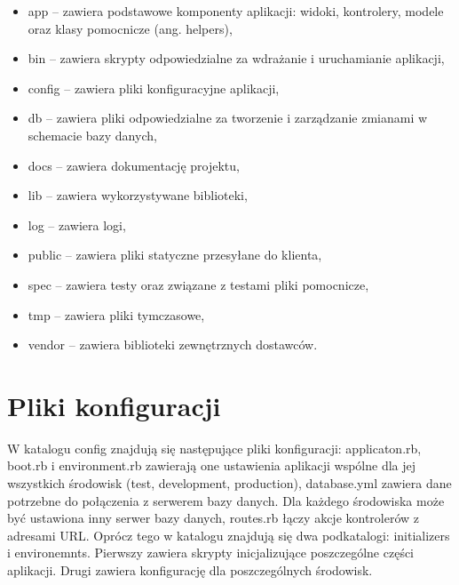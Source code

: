 \begin{itemize}
\item app – zawiera podstawowe komponenty aplikacji: widoki, kontrolery, modele oraz klasy pomocnicze (ang. helpers),
\item bin – zawiera skrypty odpowiedzialne za wdrażanie i uruchamianie aplikacji,
\item config – zawiera pliki konfiguracyjne aplikacji,
\item db – zawiera pliki odpowiedzialne za tworzenie i zarządzanie zmianami w schemacie bazy danych,
\item docs – zawiera dokumentację projektu,
\item lib – zawiera wykorzystywane biblioteki,
\item log – zawiera logi,
\item public – zawiera pliki statyczne przesyłane do klienta,
\item spec – zawiera testy oraz związane z testami pliki pomocnicze,
\item tmp – zawiera pliki tymczasowe,
\item vendor – zawiera biblioteki zewnętrznych dostawców.
\end{itemize}

\section{Pliki konfiguracji}

W katalogu config znajdują się następujące pliki konfiguracji: applicaton.rb, boot.rb i environment.rb zawierają one ustawienia aplikacji wspólne dla jej wszystkich środowisk (test, development, production), database.yml zawiera dane potrzebne do połączenia z serwerem bazy danych. Dla każdego środowiska może być ustawiona inny serwer bazy danych, routes.rb łączy akcje kontrolerów z adresami URL. Oprócz tego w katalogu znajdują się dwa podkatalogi: initializers i environemnts. Pierwszy zawiera skrypty inicjalizujące poszczególne części aplikacji. Drugi zawiera konfigurację dla poszczególnych środowisk.